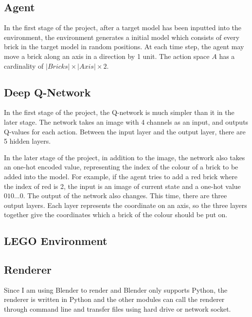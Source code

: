 \documentclass[a4paper]{article}
\begin{document}
        
        
        \subsection{Agent}
        
            In the first stage of the project, after a target model has been inputted into the environment, the environment generates a initial model which consists of every brick in the target model in random positions. At each time step, the agent may move a brick along an axis in a direction by 1 unit. The action space $A$ has a cardinality of $|Bricks| \times |Axis| \times 2$. 
        
        
        \subsection{Deep Q-Network}
            
            In the first stage of the project, the Q-network is much simpler than it in the later stage. The network takes an image with 4 channels as an input, and outputs Q-values for each action. Between the input layer and the output layer, there are 5 hidden layers. 
            
            In the later stage of the project, in addition to the image, the network also takes an one-hot encoded value, representing the index of the colour of a brick to be added into the model. For example, if the agent tries to add a red brick where the index of red is 2, the input is an image of current state and a one-hot value $010...0$. The output of the network also changes. This time, there are three output layers. Each layer represents the coordinate on an axis, so the three layers together give the coordinates which a brick of the colour should be put on. 
        
        
        \subsection{LEGO Environment}
        
        
        \subsection{Renderer}
        
            Since I am using Blender to render and Blender only supports Python, the renderer is written in Python and the other modules can call the renderer through command line and transfer files using hard drive or network socket. 
            
\end{document}
